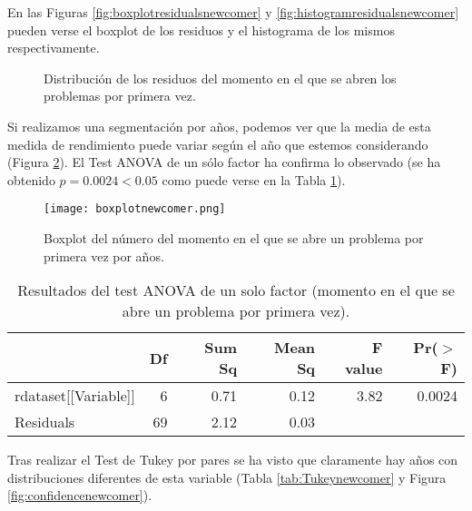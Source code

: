 En las Figuras \ref{fig:boxplotresidualsnewcomer} y \ref{fig:histogramresidualsnewcomer} pueden verse el boxplot de los residuos y el histograma de los mismos respectivamente.

\begin{figure}[H]
\centering
{}\qquad
{}
\caption{Distribución de los residuos del momento en el que se abren los problemas por primera vez.}
\label{fig:newcomer}
\end{figure}

Si realizamos una segmentación por años, podemos ver que la media de esta medida de rendimiento puede variar según el año que estemos considerando (Figura \ref{fig:boxplotnewcomer}). El Test ANOVA de un sólo factor ha confirma lo observado (se ha obtenido $p = 0.0024 < 0.05$ como puede verse en la Tabla \ref{tab:ANOVAnewcomer}).

\begin{figure}[H]
    \centering
    \texttt{[image: boxplotnewcomer.png]}
    \caption{Boxplot del número del momento en el que se abre un problema por primera vez por años.}
    \label{fig:boxplotnewcomer}
\end{figure}

\begin{table}[H]
\centering
\caption{Resultados del test ANOVA de un solo factor (momento en el que se abre un problema por primera vez).}
\label{tab:ANOVAnewcomer}
\begin{tabular}{lrrrrr}
  \hline
 & Df & Sum Sq & Mean Sq & F value & Pr($>$F) \\ 
  \hline
rdataset[[Variable]] & 6 & 0.71 & 0.12 & 3.82 & 0.0024 \\ 
  Residuals            & 69 & 2.12 & 0.03 &  &  \\ 
   \hline
\end{tabular}
\end{table}

Tras realizar el Test de Tukey por pares se ha visto que claramente hay años con distribuciones diferentes de esta variable (Tabla \ref{tab:Tukeynewcomer} y Figura \ref{fig:confidencenewcomer}).

